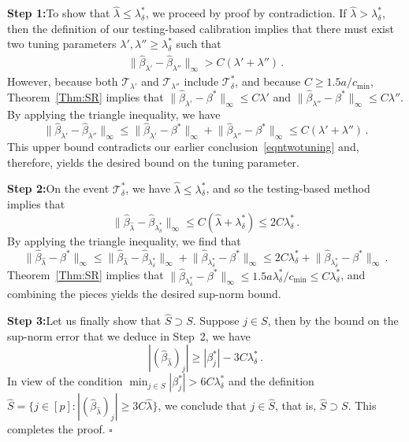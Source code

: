 \documentclass{elsarticle}
\newcommand*{\QEDB}{\hfill\ensuremath{\square}}
\newcommand\norm[1]{\lVert#1\rVert}
\newcommand{\truepara}{{\beta^*}}
\newcommand{\trueparaj}{{\beta^*_j}}
\newcommand{\estipara}{{\hat{\beta}}}
\newcommand{\tuning}{{\lambda}}
\newcommand{\ratio}{a}
\begin{document}
\textbf{Step 1:}\enspace  To show that
$\hat{\tuning} \leq \tuning_{\delta}^*$, we proceed by proof by contradiction. If $\hat{\tuning}>\tuning_{\delta}^*$, then the definition of our testing-based calibration implies that there must exist two tuning parameters $\tuning',\tuning''\geq \tuning_{\delta}^*$ such that
\begin{align}\label{eqntwotuning}
\norm{\estipara_{\tuning'}-\estipara_{\tuning''}}_{\infty}>C(\tuning'+\tuning'')\,.
\end{align}
However, because both $\mathcal{T}_{\tuning'}$ and $\mathcal{T}_{\tuning''}$
include $\mathcal{T}_{\delta}^*$, and because $C\geq 1.5\ratio/c_{\min}$, Theorem~\ref{Thm:SR} implies that $\norm{\estipara_{\tuning'}-\truepara}_{\infty}\leq C\tuning'$ and $\norm{\estipara_{\tuning''}-\truepara}_{\infty}\leq C\tuning''$. By applying the triangle inequality, we have
\[
\norm{\estipara_{\tuning'}-\estipara_{\tuning''}}_{\infty}\leq \norm{\estipara_{\tuning'}-\truepara}_{\infty}+\norm{\estipara_{\tuning''}-\truepara}_{\infty}\leq
C(\tuning'+\tuning'')\,.
\]
This upper bound contradicts our earlier conclusion~\eqref{eqntwotuning} and, therefore, yields the desired bound on the tuning parameter.

\textbf{Step 2:}\enspace On the event $\mathcal{T}_{\delta}^*$, we have $\hat{\tuning} \leq \tuning_{\delta}^*$, and so the testing-based method implies that
\[
\norm{\estipara_{\hat{\tuning}}-\estipara_{\tuning_{\delta}^*}}_{\infty}\leq C(\hat{\tuning}+\tuning_{\delta}^*)\leq 2 C\tuning_{\delta}^*\,.
\]
By applying the triangle inequality, we find that
\[
\norm{\estipara_{\hat{\tuning}}-\truepara}_{\infty}\leq \norm{\estipara_{\hat{\tuning}}-\estipara_{\tuning_{\delta}^*}}_{\infty}+
\norm{\estipara_{\tuning_{\delta}^*}-\truepara}_{\infty}\leq
2C\tuning_{\delta}^*+\norm{\estipara_{\tuning_{\delta}^*}-\truepara}_{\infty}\,.
\]
Theorem~\ref{Thm:SR} implies that $\norm{\estipara_{\tuning_{\delta}^*}-\truepara}_{\infty}\leq 1.5\ratio\tuning_{\delta}^*/c_{\min}\leq C\tuning_{\delta}^*$, and combining the pieces  yields the desired sup-norm bound.

\textbf{Step 3:}\enspace Let us finally show that $\hat{S}\supset S$. Suppose $j\in S$, then by the bound on the sup-norm error that we deduce in Step~2, we have
\[
|(\estipara_{\hat{\tuning}})_j|\geq |\trueparaj| - 3C\tuning_{\delta}^*\,.
\]
In view of the condition $\min_{j\in S}|\trueparaj|>6C\tuning_{\delta}^*$ and the definition $\hat{S}=\{j\in [p]:|(\estipara_{\hat{\tuning}})_j|\geq 3C\hat{\tuning}\}$, we conclude that $j\in \hat{S}$, that is, $\hat{S}\supset S$. This completes the proof.
\QEDB
\end{document}
